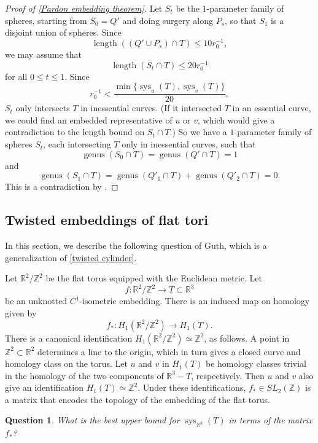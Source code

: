 \documentclass[12pt]{amsart}
\DeclareMathOperator*{\length}{length}
\DeclareMathOperator*{\sys}{sys}
\DeclareMathOperator*{\genus}{genus}
\newtheorem{question}[theorem]{Question}
\theoremstyle{definition}
\begin{document}
\begin{proof}[Proof of \cref{Pardon embedding theorem}]
Let $S_t$ be the $1$-parameter family of spheres, starting from $S_0=Q'$ and doing surgery along $P_s$, so that $S_1$ is a disjoint union of spheres. Since $$\length((Q'\cup P_s)\cap T)\leq 10r_0^{-1},$$ we may assume that $$\length(S_t\cap T)\leq 20r_0^{-1}$$ for all $0\leq t\leq 1$. Since $$r_0^{-1}< \frac{\textstyle\min\{\sys_u(T),\sys_v(T)\}}{20},$$ $S_t$ only intersects $T$ in inessential curves. (If it intersected $T$ in an essential curve, we could find an embedded representative of $u$ or $v$, which would give a contradiction to the length bound on $S_t\cap T$.) So we have a $1$-parameter family of spheres $S_t$, each intersecting $T$ only in inessential curves, such that $$\genus(S_0\cap T)=\genus(Q'\cap T)=1$$ and $$\genus(S_1\cap T)=\genus(Q'_1\cap T)+\genus(Q'_2\cap T)=0.$$ This is a contradiction by \cite[Lemma 2.3]{Par11}. 
\end{proof}

\subsection{Twisted embeddings of flat tori} \label{Appendix A3} In this section, we describe the following question of Guth, which is a generalization of \cref{twisted cylinder}. 

Let $\mathbb{R}^2/\mathbb{Z}^2$ be the flat torus equipped with the Euclidean metric. Let $$f:\mathbb{R}^2/\mathbb{Z}^2\to T\subset \mathbb{R}^3$$ be an unknotted $C^1$-isometric embedding. There is an induced map on homology given by $$f_*:H_1(\mathbb{R}^2/\mathbb{Z}^2)\to H_1(T).$$ There is a canonical identification $H_1(\mathbb{R}^2/\mathbb{Z}^2)\simeq \mathbb{Z}^2$, as follows. A point in $\mathbb{Z}^2\subset \mathbb{R}^2$ determines a line to the origin, which in turn gives a closed curve and homology class on the torus. Let $u$ and $v$ in $H_1(T)$ be homology classes trivial in the homology of the two components of $\mathbb{R}^3-T$, respectively. Then $u$ and $v$ also give an identification $H_1(T)\simeq \mathbb{Z}^2$. Under these identifications, $f_*\in SL_2(\mathbb{Z})$ is a matrix that encodes the topology of the embedding of the flat torus.

\begin{question} What is the best upper bound for $\sys_{\mathbb{R}^3}(T)$ in terms of the matrix $f_*$?
\end{question}
\end{document}
